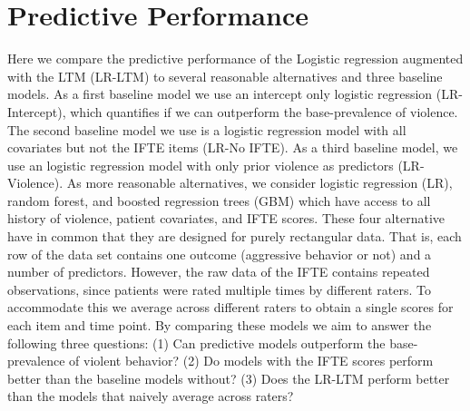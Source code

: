 \documentclass[a4paper,11pt]{article}
\begin{document}




\section{Predictive Performance}

Here we compare the predictive performance of the Logistic regression augmented with the LTM (LR-LTM) to several reasonable alternatives and three baseline models.
As a first baseline model we use an intercept only logistic regression (LR-Intercept), which quantifies if we can outperform the base-prevalence of violence.
The second baseline model we use is a logistic regression model with all covariates but not the IFTE items (LR-No IFTE).
As a third baseline model, we use an logistic regression model with only prior violence as predictors (LR-Violence).
As more reasonable alternatives, we consider logistic regression (LR), random forest, and boosted regression trees (GBM) which have access to all history of violence, patient covariates, and IFTE scores.
These four alternative have in common that they are designed for purely rectangular data.
That is, each row of the data set contains one outcome (aggressive behavior or not) and a number of predictors.
However, the raw data of the IFTE contains repeated observations, since patients were rated multiple times by different raters.
To accommodate this we average across different raters to obtain a single scores for each item and time point.
By comparing these models we aim to answer the following three questions: (1) Can predictive models outperform the base-prevalence of violent behavior? (2) Do models with the IFTE scores perform better than the baseline models without? (3) Does the LR-LTM perform better than the models that naively average across raters?
\end{document}
